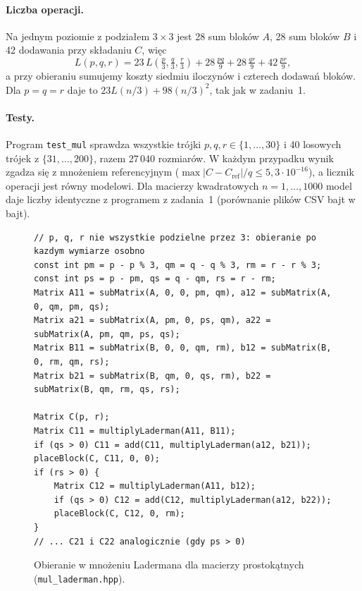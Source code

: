 \paragraph{Liczba operacji.} Na jednym poziomie z podziałem $3\times3$ jest 28 sum bloków $A$, 28 sum bloków $B$
i 42 dodawania przy składaniu $C$, więc
\[
L(p,q,r)=23\,L\!\left(\tfrac p3,\tfrac q3,\tfrac r3\right)+28\,\tfrac{pq}{9}+28\,\tfrac{qr}{9}+42\,\tfrac{pr}{9},
\]
a przy obieraniu sumujemy koszty siedmiu iloczynów i czterech dodawań bloków. Dla $p=q=r$ daje to
$23L(n/3)+98(n/3)^2$, tak jak w zadaniu~1.

\paragraph{Testy.} Program \texttt{test\_mul} sprawdza wszystkie trójki $p,q,r\in\{1,\dots,30\}$ i 40 losowych
trójek z $\{31,\dots,200\}$, razem 27\,040 rozmiarów. W każdym przypadku wynik zgadza się z mnożeniem
referencyjnym ($\max|C-C_{\mathrm{ref}}|/q\le5{,}3\cdot10^{-16}$), a licznik operacji jest równy modelowi. Dla macierzy
kwadratowych $n=1,\dots,1000$ model daje liczby identyczne z programem z zadania~1 (porównanie plików CSV bajt
w bajt).

\begin{figure}[H]
\centering
\begin{lstlisting}
// p, q, r nie wszystkie podzielne przez 3: obieranie po kazdym wymiarze osobno
const int pm = p - p % 3, qm = q - q % 3, rm = r - r % 3;
const int ps = p - pm, qs = q - qm, rs = r - rm;
Matrix A11 = subMatrix(A, 0, 0, pm, qm), a12 = subMatrix(A, 0, qm, pm, qs);
Matrix a21 = subMatrix(A, pm, 0, ps, qm), a22 = subMatrix(A, pm, qm, ps, qs);
Matrix B11 = subMatrix(B, 0, 0, qm, rm), b12 = subMatrix(B, 0, rm, qm, rs);
Matrix b21 = subMatrix(B, qm, 0, qs, rm), b22 = subMatrix(B, qm, rm, qs, rs);

Matrix C(p, r);
Matrix C11 = multiplyLaderman(A11, B11);
if (qs > 0) C11 = add(C11, multiplyLaderman(a12, b21));
placeBlock(C, C11, 0, 0);
if (rs > 0) {
    Matrix C12 = multiplyLaderman(A11, b12);
    if (qs > 0) C12 = add(C12, multiplyLaderman(a12, b22));
    placeBlock(C, C12, 0, rm);
}
// ... C21 i C22 analogicznie (gdy ps > 0)
\end{lstlisting}
\caption{Obieranie w mnożeniu Ladermana dla macierzy prostokątnych (\texttt{mul\_laderman.hpp}).}
\end{figure}
